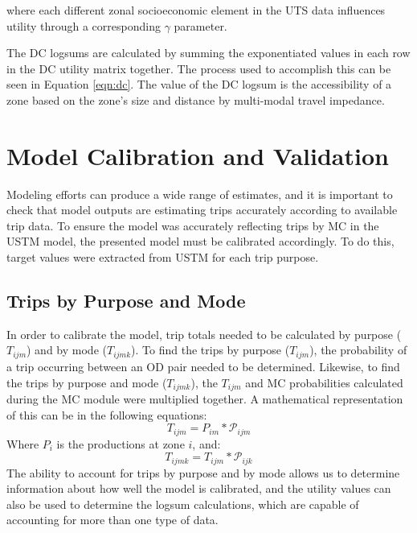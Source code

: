 \noindent where each different zonal socioeconomic element in the UTS data influences
utility through a corresponding $\gamma$ parameter.

The DC logsums are calculated by summing the exponentiated values in each row in the DC utility matrix
together. The process used to accomplish this can be seen
in Equation \ref{eqn:dc}. The value of the DC logsum is the accessibility of
a zone based on the zone's size and distance by multi-modal travel impedance.


\section{Model Calibration and Validation}

Modeling efforts can produce a wide range of estimates, and it is important to
check that model outputs are estimating trips accurately according to available trip data.
To ensure the model was accurately reflecting trips by MC in the USTM model,
the presented model must be
calibrated accordingly. To do this, target values were extracted from
USTM for each trip purpose.

\subsection{Trips by Purpose and Mode}

In order to calibrate the model, trip totals needed to be calculated by purpose
(\(T_{ijm}\)) and by mode (\(T_{ijmk}\)). To find the trips by purpose
(\(T_{ijm}\)), the probability of a trip occurring between an OD pair needed to
be determined. Likewise, to find the trips by purpose and mode (\(T_{ijmk}\)),
the \(T_{ijm}\) and MC probabilities calculated during the MC
module were multiplied together. A mathematical representation of this can be in the following equations:
\begin{equation}
	T_{ijm} = P_{im} * \mathcal{P}_{ijm}
	\label{eqn:ij}
\end{equation}
\noindent Where $P_i$ is the productions at zone $i$, and:
\begin{equation}
	T_{ijmk} = T_{ijm} * \mathcal{P}_{ijk}
	\label{eqn:ijk}
\end{equation}
\noindent The ability to account for trips by purpose and by mode allows us to
determine information about how well the model is calibrated, and the utility
values can also be used to determine the logsum calculations, which are capable
of accounting for more than one type of data.


